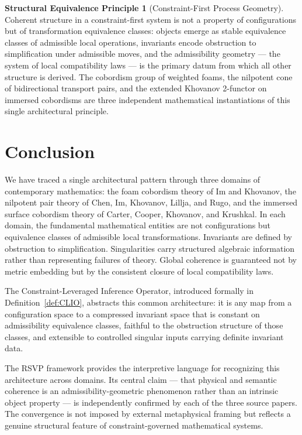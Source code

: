\documentclass[12pt, a4paper]{article}
\theoremstyle{plain}
\theoremstyle{definition}
\theoremstyle{correspondence}
\newtheorem{strucprin}[theorem]{Structural Equivalence Principle}
\begin{document}
\begin{strucprin}[Constraint-First Process Geometry]
\label{sp:main}
Coherent structure in a constraint-first system is not a property of configurations
but of transformation equivalence classes: objects emerge as stable equivalence classes
of admissible local operations, invariants encode obstruction to simplification under
admissible moves, and the admissibility geometry --- the system of local compatibility
laws --- is the primary datum from which all other structure is derived. The cobordism
group of weighted foams, the nilpotent cone of bidirectional transport pairs, and the
extended Khovanov 2-functor on immersed cobordisms are three independent mathematical
instantiations of this single architectural principle.
\end{strucprin}

\section{Conclusion}

We have traced a single architectural pattern through three domains of contemporary
mathematics: the foam cobordism theory of Im and Khovanov, the nilpotent pair theory of
Chen, Im, Khovanov, Lillja, and Rugo, and the immersed surface cobordism theory of
Carter, Cooper, Khovanov, and Krushkal. In each domain, the fundamental mathematical
entities are not configurations but equivalence classes of admissible local
transformations. Invariants are defined by obstruction to simplification. Singularities
carry structured algebraic information rather than representing failures of theory.
Global coherence is guaranteed not by metric embedding but by the consistent closure of
local compatibility laws.

The Constraint-Leveraged Inference Operator, introduced formally in
Definition~\ref{def:CLIO}, abstracts this common architecture: it is any map from a
configuration space to a compressed invariant space that is constant on admissibility
equivalence classes, faithful to the obstruction structure of those classes, and
extensible to controlled singular inputs carrying definite invariant data.

The RSVP framework provides the interpretive language for recognizing this architecture
across domains. Its central claim --- that physical and semantic coherence is an
admissibility-geometric phenomenon rather than an intrinsic object property --- is
independently confirmed by each of the three source papers. The convergence is not
imposed by external metaphysical framing but reflects a genuine structural feature of
constraint-governed mathematical systems.
\end{document}
